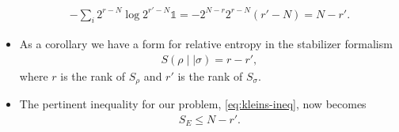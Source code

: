 \begin{itemize}
\begin{align}
      -\sum_i 2^{r-N} \log 2^{r'-N} \mathds{1} =
      -2^{N-r}2^{r-N}\left(r'-N\right)= N-r'
    .\end{align}
  \item As a corollary we have a form for relative entropy in the stabilizer
    formalism
    \begin{align}
      S(\rho \mid\mid \sigma) = r - r'
    ,\end{align}
    where $r$ is the rank of $S_\rho$ and $r'$ is the rank of $S_\sigma$.
  \item The pertinent inequality for our problem, \cref{eq:kleins-ineq}, now
    becomes
    \begin{align}
      S_E \leq N-r'
    .\end{align}
\end{itemize}

%
%
%
%
%
%
